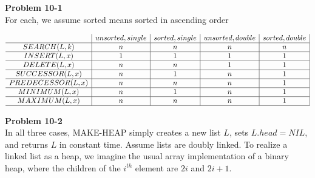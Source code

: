 \documentclass{article}
\begin{document}
\noindent\textbf{ Problem 10-1} \\

For each, we assume sorted means sorted in ascending order

$
\begin{array}{c|c|c|c|c|}
&unsorted,single& sorted,single&unsorted,double&sorted,double\\
\hline
SEARCH(L,k)&n&n&n&n\\
\hline
INSERT(L,x)&1&1&1&1\\
\hline
DELETE(L,x)&n&n&1&1\\
\hline
SUCCESSOR(L,x)&n&1&n&1\\
\hline
PREDECESSOR(L,x)&n&n&n&1\\
\hline
MINIMUM(L,x)&n&1&n&1\\
\hline
MAXIMUM(L,x)&n&n&n&1\\
\hline

\end{array}
$

\noindent\textbf{Problem 10-2}\\

In all three cases, MAKE-HEAP simply creates a new list $L$, sets $L.head = NIL$, and returns $L$ in constant time.  Assume lists are doubly linked.  To realize a linked list as a heap, we imagine the usual array implementation of a binary heap, where the children of the $i^{th}$ element are $2i$ and $2i+1$.  
\end{document}
